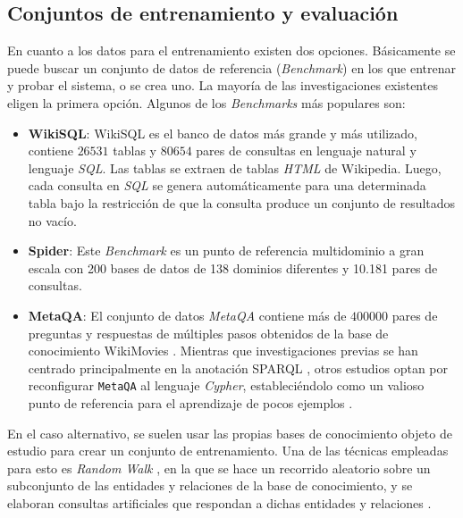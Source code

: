 \subsection{Conjuntos de entrenamiento y evaluación} \label{neurosymbolic_approach_bechmarks}

En cuanto a los datos para el entrenamiento existen dos opciones. Básicamente se puede buscar un conjunto de datos de referencia (\textit{Benchmark}) en los que entrenar y probar el sistema, o se crea uno. La mayoría de las investigaciones existentes eligen la primera opción. Algunos de los \textit{Benchmarks} más populares son:

\begin{itemize}
	\item \textbf{WikiSQL}: WikiSQL \cite{zhongetal2017} es el banco de datos más grande y más utilizado, contiene $26531$ tablas y $80654$ pares de consultas en lenguaje natural y lenguaje \textit{SQL}. Las tablas se extraen de tablas \textit{HTML} de Wikipedia. Luego, cada consulta en \textit{SQL} se genera automáticamente para una determinada tabla bajo la restricción de que la consulta produce un conjunto de resultados no vacío.

	\item \textbf{Spider}: Este \textit{Benchmark} \cite{spiderdataset} es un punto de referencia multidominio a gran escala con 200 bases de datos de 138 dominios diferentes y 10.181 pares de consultas.

	\item \textbf{MetaQA}: El conjunto de datos \textit{MetaQA} \cite{metaqa} contiene más de $400000$ pares de preguntas y respuestas de múltiples pasos obtenidos de la base de conocimiento WikiMovies \cite{milleretal2016}. Mientras que investigaciones previas se han centrado principalmente en la anotación SPARQL \cite{huangetal2021}, otros estudios optan por reconfigurar \texttt{MetaQA} al lenguaje \textit{Cypher}, estableciéndolo como un valioso punto de referencia para el aprendizaje de pocos ejemplos \cite{Nie2022GraphQ}.

\end{itemize}

En el caso alternativo, se suelen usar las propias bases de conocimiento objeto de estudio para crear un conjunto de entrenamiento. Una de las técnicas empleadas para esto es \textit{Random Walk} \cite{randomwalk}, en la que se hace un recorrido aleatorio sobre un subconjunto de las entidades y relaciones de la base de conocimiento, y se elaboran consultas artificiales que respondan a dichas entidades y relaciones \cite{adrianbazaga2021}.

